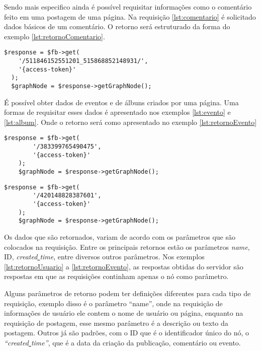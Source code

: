 Sendo mais especifico ainda é possível requisitar informações como o comentário feito em uma postagem de uma página. Na requisição \ref{lst:comentario} é solicitado dados básicos de um comentário. O retorno será estruturado da forma do exemplo \ref{lst:retornoComentario}.

\begin{lstlisting}[caption={Requisitar informações de um comentário específico},label={lst:comentario}]
  $response = $fb->get(
    '/511846152551201_515868852148931/',
    '{access-token}'
  );
  $graphNode = $response->getGraphNode();
\end{lstlisting}

É possível obter dados de eventos e de álbuns criados por uma página. Uma formas de requisitar esses dados é apresentado nos exemplos \ref{lst:evento} e \ref{lst:album}. Onde o retorno será como apresentado no exemplo \ref{lst:retornoEvento}

\begin{lstlisting}[caption={Requisitar uma evento específico},label={lst:evento}]
	$response = $fb->get(
    	'/383399765490475',
    	'{access-token}'
	);
	$graphNode = $response->getGraphNode();
\end{lstlisting}

\begin{lstlisting}[caption={Requisitar uma álbum específico},label={lst:album}]
	$response = $fb->get(
		'/420148828387601',
		'{access-token}'
	);
	$graphNode = $response->getGraphNode();
\end{lstlisting}

Os dados que são retornados, variam de acordo com os parâmetros que são colocados na requisição. Entre os principais retornos estão os parâmetros \textit{name}, ID, \textit{created\underline{{ }}time}, entre diversos outros parâmetros. Nos exemplos \ref{lst:retornoUsuario} a \ref{lst:retornoEvento}, as respostas obtidas do servidor são respostas em que as requisições continham apenas o nó como parâmetro.  

Alguns parâmetros de retorno podem ter definições diferentes para cada tipo de requisição, exemplo disso é o parâmetro ``name'', onde na requisição de informações de usuário ele contem o nome de usuário ou página, enquanto na requisição de postagem, esse mesmo parâmetro é a descrição ou texto da postagem. Outros já são padrões, com o ID que é o identificador único do nó, o \textit{``created\underline{{ }}time''}, que é a data da criação da publicação, comentário ou evento.

